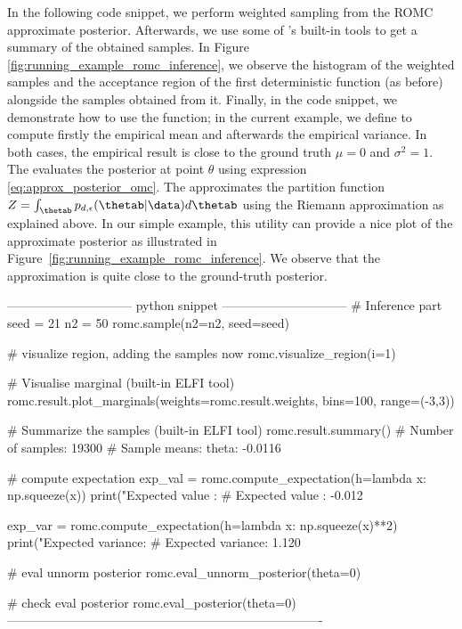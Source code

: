 In the following code snippet, we perform weighted sampling from the
ROMC approximate posterior. Afterwards, we use some of 's
built-in tools to get a summary of the obtained samples. In Figure
\ref{fig:running_example_romc_inference}, we observe the histogram of the weighted
samples and the acceptance region of the first deterministic function
(as before) alongside the samples obtained from it. Finally, in the
code snippet, we demonstrate how to use the 
function; in the current example, we define  to compute
firstly the empirical mean and afterwards the empirical variance. In
both cases, the empirical result is close to the ground truth
$\mu = 0$ and $\sigma^2 = 1$. The
 evaluates the posterior at
point $\theta$ using expression \eqref{eq:approx_posterior_omc}. The
 approximates the partition function
$Z = \int_{\thetab} p_{d,\epsilon}(\thetab|\data) d\thetab$ using the
Riemann approximation as explained above. In our simple example, this
utility can provide a nice plot of the approximate posterior as
illustrated in Figure~\ref{fig:running_example_romc_inference}. We observe that the
approximation is quite close to the ground-truth posterior.

\begin{Code}
------------------------------ python snippet ------------------------------  
  # Inference part
  seed = 21
  n2 = 50
  romc.sample(n2=n2, seed=seed)

  # visualize region, adding the samples now
  romc.visualize_region(i=1)

  # Visualise marginal (built-in ELFI tool)
  romc.result.plot_marginals(weights=romc.result.weights,
                             bins=100, range=(-3,3))

  # Summarize the samples (built-in ELFI tool)
  romc.result.summary()
  # Number of samples: 19300
  # Sample means: theta: -0.0116

  # compute expectation
  exp_val = romc.compute_expectation(h=lambda x: np.squeeze(x))
  print("Expected value   : %
  # Expected value   : -0.012

  exp_var = romc.compute_expectation(h=lambda x: np.squeeze(x)**2)
  print("Expected variance: %
  # Expected variance: 1.120

  # eval unnorm posterior
  romc.eval_unnorm_posterior(theta=0)

  # check eval posterior
  romc.eval_posterior(theta=0)
----------------------------------------------------------------------------
\end{Code}

